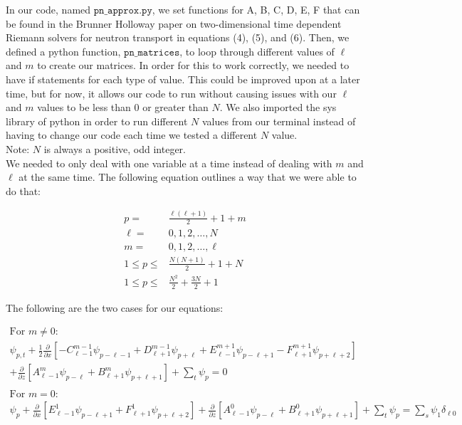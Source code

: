 
In our code, named $\texttt{pn\_approx.py}$, we set functions for A, B, C, D, E, F that can be found in the Brunner Holloway paper on two-dimensional time dependent Riemann solvers for neutron transport in equations (4), (5), and (6). Then, we defined a python function, $\texttt{pn\_matrices}$, to loop through different values of $\ell$ and $m$ to create our matrices. In order for this to work correctly, we needed to have if statements for each type of value. This could be improved upon at a later time, but for now, it allows our code to run without causing issues with our $\ell$ and $m$ values to be less than $0$ or greater than $N$. We also imported the sys library of python in order to run different $N$ values from our terminal instead of having to change our code each time we tested a different $N$ value. \\

Note: $N$ is always a positive, odd integer. \\

We needed to only deal with one variable at a time instead of dealing with $m$ and $\ell$ at the same time. The following equation outlines a way that we were able to do that:

\begin{align*}
p = &\frac{\ell(\ell + 1)}{2} + 1 + m \\
\ell = &0, 1, 2, \dots, N \\
m = &0, 1, 2, \dots, \ell \\
1\leq p \leq &\frac{N(N + 1)}{2} + 1 + N \\
1\leq p \leq &\frac{N^2}{2} + \frac{3N}{2} +1
\end{align*}

The following are the two cases for our equations:

\begin{align*}
\text{For } m \neq 0 \text{:} \\
\psi_{p,t} + \frac{1}{2} \frac{\partial}{\partial x} [-C_{\ell - 1}^{m-1} \psi_{p-\ell-1} + D_{\ell + 1}^{m-1} \psi_{p + \ell} + E_{\ell - 1}^{m + 1} \psi_{p- \ell +1} - F_{\ell + 1}^{m+1} \psi_{p + \ell + 2} ] \\ + \frac{\partial}{\partial z} [A_{\ell - 1}^{m} \psi_{p-\ell} + B_{\ell + 1}^{m} \psi_{p+\ell+1}] + \sum_t \psi_p = 0 \\ \\
\text{For } m = 0 \text{:} \\
\psi_p + \frac{\partial}{\partial x}[E_{\ell - 1}^1 \psi_{p-\ell +1} + F_{\ell + 1}^1 \psi_{p+\ell+2}] + \frac{\partial}{\partial z}[A_{\ell - 1}^0 \psi_{p-\ell} + B_{\ell+1}^0 \psi_{p+\ell+1}] + \sum_t \psi_p = \sum_s \psi_1 \delta_{\ell 0}
\end{align*}

